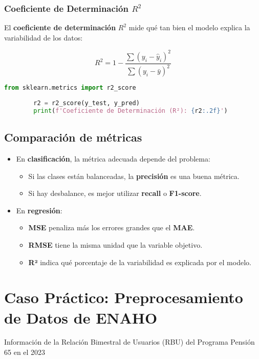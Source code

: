 \documentclass{book}
\begin{document}
	\subsubsection{Coeficiente de Determinación \( R^2 \)}
	
	El \textbf{coeficiente de determinación} \( R^2 \) mide qué tan bien el modelo explica la variabilidad de los datos:
	
	\[
	R^2 = 1 - \frac{\sum (y_i - \hat{y}_i)^2}{\sum (y_i - \bar{y})^2}
	\]
	
	\begin{lstlisting}[language=Python, caption=Cálculo de \( R^2 \)]
		from sklearn.metrics import r2_score
		
		r2 = r2_score(y_test, y_pred)
		print(f'Coeficiente de Determinación (R²): {r2:.2f}')
	\end{lstlisting}
	
	\subsection{Comparación de métricas}
	
	\begin{itemize}
		\item En \textbf{clasificación}, la métrica adecuada depende del problema:
		\begin{itemize}
			\item Si las clases están balanceadas, la \textbf{precisión} es una buena métrica.
			\item Si hay desbalance, es mejor utilizar \textbf{recall} o \textbf{F1-score}.
		\end{itemize}
		\item En \textbf{regresión}:
		\begin{itemize}
			\item \textbf{MSE} penaliza más los errores grandes que el \textbf{MAE}.
			\item \textbf{RMSE} tiene la misma unidad que la variable objetivo.
			\item \textbf{R²} indica qué porcentaje de la variabilidad es explicada por el modelo.
		\end{itemize}
	\end{itemize}
	
	\section{Caso Pr\'actico: Preprocesamiento de Datos de ENAHO}
	Información de la Relación Bimestral de Usuarios (RBU) del Programa Pensión 65 en el 2023
	
\end{document}
